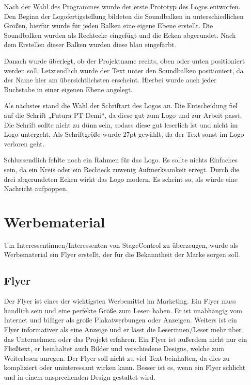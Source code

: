 Nach der Wahl des Programmes wurde der erste Prototyp des Logos entworfen. Den Beginn der Logofertigstellung bildeten die Soundbalken in unterschiedlichen Größen, hierfür wurde für jeden Balken eine eigene Ebene erstellt. Die Soundbalken wurden als Rechtecke eingefügt und die Ecken abgerundet. Nach dem Erstellen dieser Balken wurden diese blau eingefärbt. 

Danach wurde überlegt, ob der Projektname rechts, oben oder unten positioniert werden soll. Letztendlich wurde der Text unter den Soundbalken positioniert, da der Name hier am übersichtlichsten erscheint. Hierbei wurde auch jeder Buchstabe in einer eigenen Ebene angelegt. 

Als nächstes stand die Wahl der Schriftart des Logos an. Die Entscheidung fiel auf die Schrift „Futura PT Demi“, da diese gut zum Logo und zur Arbeit passt. Die Schrift sollte nicht zu dünn sein, sodass diese gut leserlich ist und nicht im Logo untergeht. Als Schriftgröße wurde 27pt gewählt, da der Text sonst im Logo verloren geht. 

Schlussendlich fehlte noch ein Rahmen für das Logo. Es sollte nichts Einfaches sein, da ein Kreis oder ein Rechteck zuwenig Aufmerksamkeit erregt. Durch die drei abgerundeten Ecken  wirkt das Logo modern. Es scheint so, als würde eine Nachricht aufpoppen. 

\section{Werbematerial}
Um Interessentinnen/Interessenten von StageControl zu überzeugen, wurde als Werbematerial ein Flyer erstellt, der für die Bekanntheit der Marke sorgen soll.

\subsection{Flyer}
Der Flyer ist eines der wichtigsten Werbemittel im Marketing. Ein Flyer muss handlich sein und eine perfekte Größe zum Lesen haben. Er ist unabhängig vom Internet und billiger als große Plakatwerbungen oder Anzeigen. Weiters ist ein Flyer informativer als eine Anzeige und er lässt die Leserinnen/Leser mehr über das Unternehmen oder das Projekt erfahren. Ein Flyer ist außerdem nicht nur ein Fließtext, er beinhaltet auch Bilder und verschiedene Designs, welche zum Weiterlesen anregen. Der Flyer soll nicht zu viel Text beinhalten, da dies zu kompliziert oder uninteressant wirken kann. Besser ist es, wenn ein Flyer schlicht und in einem ansprechenden Design gestaltet wird. \parencite{VorteilevonFlyern}

